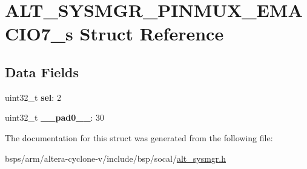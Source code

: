 \hypertarget{structALT__SYSMGR__PINMUX__EMACIO7__s}{}\section{A\+L\+T\+\_\+\+S\+Y\+S\+M\+G\+R\+\_\+\+P\+I\+N\+M\+U\+X\+\_\+\+E\+M\+A\+C\+I\+O7\+\_\+s Struct Reference}
\label{structALT__SYSMGR__PINMUX__EMACIO7__s}
\subsection*{Data Fields}
\begin{DoxyCompactItemize}
\item 
\mbox{\label{structALT__SYSMGR__PINMUX__EMACIO7__s_a8d0654d13226c261ee68ff3a915256e2}} 
uint32\+\_\+t {\bfseries sel}\+: 2
\item 
\mbox{\label{structALT__SYSMGR__PINMUX__EMACIO7__s_a7595c389e29e7d4bdf9a28608f98e40b}} 
uint32\+\_\+t {\bfseries \+\_\+\+\_\+pad0\+\_\+\+\_\+}\+: 30
\end{DoxyCompactItemize}


The documentation for this struct was generated from the following file\+:\begin{DoxyCompactItemize}
\item 
bsps/arm/altera-\/cyclone-\/v/include/bsp/socal/\mbox{\hyperlink{alt__sysmgr_8h}{alt\+\_\+sysmgr.\+h}}\end{DoxyCompactItemize}
